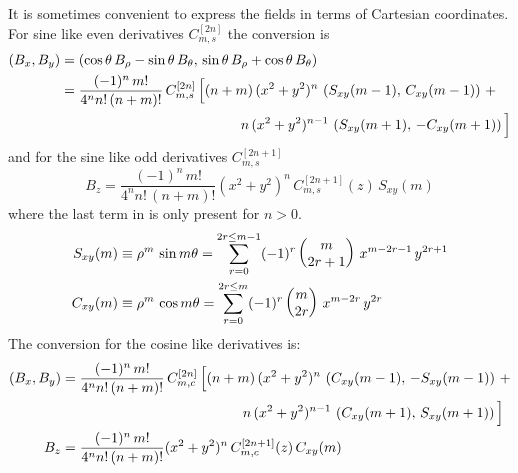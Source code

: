 It is sometimes convenient to express the fields in terms of Cartesian coordinates. For sine like
even derivatives $C_{m,s}^{[2n]}$ the conversion is
\begin{align}
  \left( B_x, B_y \right) &= \left( \cos\theta \, B_\rho - \sin\theta \, B_\theta, \,
    \sin\theta \, B_\rho + \cos\theta \, B_\theta \right) \CRNO
  &= \frac{(-1)^n \, m!}{4^n n! \, (n+m)!} \, C_{m,s}^{[2n]} \, \Big[ (n+m) \, (x^2 + y^2)^n \,
    \left( S_{xy}(m-1), \, C_{xy}(m-1) \right) \, + 
    \label{bbtb} \\
  &\hspace{13em}  n \, (x^2 + y^2)^{n-1} \, 
    \left( S_{xy}(m+1), \, -C_{xy}(m+1) \right) \Big] \nonumber
\end{align}
and for the sine like odd derivatives $C_{m,s}^{[2n+1]}$
\begin{equation}
  B_z = \frac{(-1)^n \, m!}{4^n n! \, (n+m)!}
    (x^2 + y^2)^n \, C^{[2n+1]}_{m,s}(z) \, S_{xy}(m)
\end{equation}
where the last term in  is only present for $n > 0$.
\begin{align}
  S_{xy}(m) &\equiv \rho^m \, \sin m\theta = 
    \sum_{r=0}^{2r \le m-1} (-1)^r \begin{pmatrix} m \cr 2r+1 \end{pmatrix} \,
    x^{m-2r-1} \, y^{2r+1} \nonumber \\
  C_{xy}(m) &\equiv \rho^m \, \cos m\theta = 
    \sum_{r=0}^{2r \le m} (-1)^r \begin{pmatrix} m \cr 2r \end{pmatrix} \,
    x^{m-2r} \, y^{2r} 
\end{align}
The conversion for the cosine like derivatives is:
\begin{align}
  \left( B_x, B_y \right) &= 
    \frac{(-1)^n \, m!}{4^n n! \, (n+m)!} \, C_{m,c}^{[2n]} \, \Big[ (n+m) \, (x^2 + y^2)^n \,
    \left( C_{xy}(m-1), \, -S_{xy}(m-1) \right) \, + \CRNO
  &\hspace{13em}  n \, (x^2 + y^2)^{n-1} \, 
    \left( C_{xy}(m+1), \, S_{xy}(m+1) \right) \Big] \\
  B_z &= \frac{(-1)^n \, m!}{4^n n! \, (n+m)!}
    (x^2 + y^2)^n \, C^{[2n+1]}_{m,c}(z) \, C_{xy}(m) \nonumber
\end{align}

